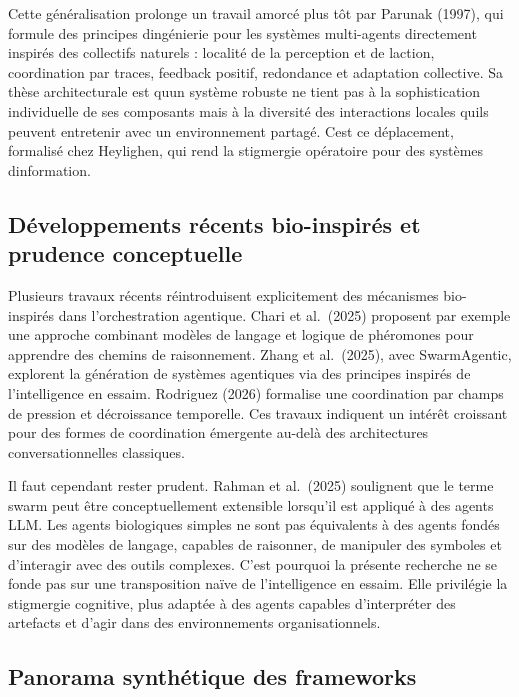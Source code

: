 Cette généralisation prolonge un travail amorcé plus tôt par Parunak
(1997), qui formule des principes d\textquotesingle ingénierie pour les
systèmes multi-agents directement inspirés des collectifs naturels :
localité de la perception et de l\textquotesingle action, coordination
par traces, feedback positif, redondance et adaptation collective. Sa
thèse architecturale est qu\textquotesingle un système robuste ne tient
pas à la sophistication individuelle de ses composants mais à la
diversité des interactions locales qu\textquotesingle ils peuvent
entretenir avec un environnement partagé. C\textquotesingle est ce
déplacement, formalisé chez Heylighen, qui rend la stigmergie
opératoire pour des systèmes d\textquotesingle information.

\subsection{Développements récents bio-inspirés et prudence conceptuelle}\label{duxe9veloppements-ruxe9cents-bio-inspiruxe9s-et-prudence-conceptuelle}

Plusieurs travaux récents réintroduisent explicitement des mécanismes bio-inspirés dans l'orchestration agentique. Chari et al.~(2025) proposent par exemple une approche combinant modèles de langage et logique de phéromones pour apprendre des chemins de raisonnement. Zhang et al.~(2025), avec SwarmAgentic, explorent la génération de systèmes agentiques via des principes inspirés de l'intelligence en essaim. Rodriguez (2026) formalise une coordination par champs de pression et décroissance temporelle. Ces travaux indiquent un intérêt croissant pour des formes de coordination émergente au-delà des architectures conversationnelles classiques.

Il faut cependant rester prudent. Rahman et al.~(2025) soulignent que le terme swarm peut être conceptuellement extensible lorsqu'il est appliqué à des agents LLM. Les agents biologiques simples ne sont pas équivalents à des agents fondés sur des modèles de langage, capables de raisonner, de manipuler des symboles et d'interagir avec des outils complexes. C'est pourquoi la présente recherche ne se fonde pas sur une transposition naïve de l'intelligence en essaim. Elle privilégie la stigmergie cognitive, plus adaptée à des agents capables d'interpréter des artefacts et d'agir dans des environnements organisationnels.



\subsection{Panorama synth\'etique des frameworks}


